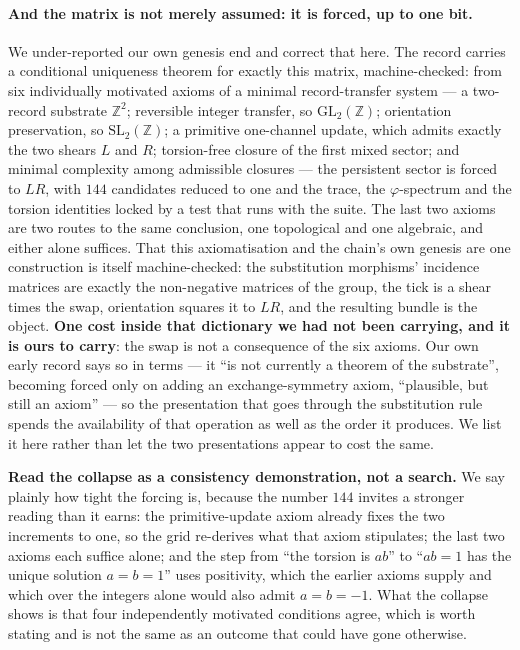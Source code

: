 \documentclass[11pt,a4paper]{article}
\theoremstyle{definition}
\theoremstyle{remark}
\newcommand{\Z}{\mathbb{Z}}
\begin{document}
\paragraph{And the matrix is not merely assumed: it is forced, up to one bit.} We under-reported our own
genesis end and correct that here. The record carries a conditional uniqueness theorem for exactly this matrix,
machine-checked: from six individually motivated axioms of a minimal record-transfer system --- a two-record
substrate $\Z^2$; reversible integer transfer, so $\mathrm{GL}_2(\Z)$; orientation preservation, so
$\mathrm{SL}_2(\Z)$; a primitive one-channel update, which admits exactly the two shears $L$ and $R$; torsion-free
closure of the first mixed sector; and minimal complexity among admissible closures --- the persistent sector is
forced to $LR$, with $144$ candidates reduced to one and the trace, the $\varphi$-spectrum and the torsion identities
locked by a test that runs with the suite. The last two axioms are two routes to the same conclusion, one topological
and one algebraic, and either alone suffices. That this axiomatisation and the chain's own genesis are one
construction is itself machine-checked: the substitution morphisms' incidence matrices are exactly the non-negative
matrices of the group, the tick is a shear times the swap, orientation squares it to $LR$, and the resulting bundle is
the object. \textbf{One cost inside that dictionary we had not been carrying, and it is ours to carry}: the swap is
not a consequence of the six axioms. Our own early record says so in terms --- it ``is not currently a theorem of the
substrate'', becoming forced only on adding an exchange-symmetry axiom, ``plausible, but still an axiom'' --- so the
presentation that goes through the substitution rule spends the availability of that operation as well as the order it
produces. We list it here rather than let the two presentations appear to cost the same.

\textbf{Read the collapse as a consistency demonstration, not a search.} We say plainly how tight the forcing is,
because the number $144$ invites a stronger reading than it earns: the primitive-update axiom already fixes the two
increments to one, so the grid re-derives what that axiom stipulates; the last two axioms each suffice alone; and the
step from ``the torsion is $ab$'' to ``$ab = 1$ has the unique solution $a = b = 1$'' uses positivity, which the earlier
axioms supply and which over the integers alone would also admit $a = b = -1$. What the collapse shows is that four
independently motivated conditions agree, which is worth stating and is not the same as an outcome that could have
gone otherwise.
\end{document}
